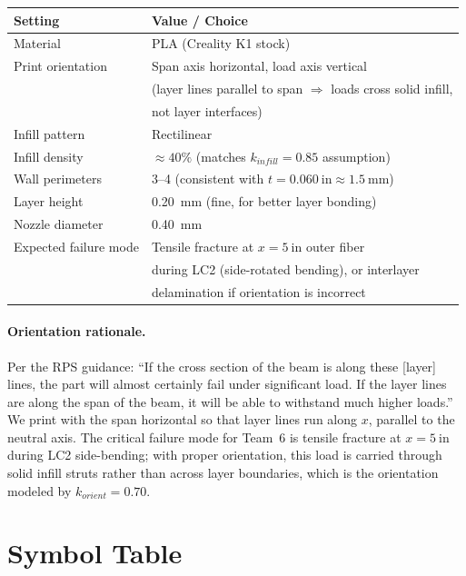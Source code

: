 \documentclass[11pt,letterpaper]{article}
\begin{document}
\begin{center}
\begin{tabular}{ll}
\toprule
Setting & Value / Choice \\
\midrule
Material           & PLA (Creality K1 stock) \\
Print orientation  & Span axis horizontal, load axis vertical \\
                   & (layer lines parallel to span $\Rightarrow$ loads cross solid infill, \\
                   & not layer interfaces) \\
Infill pattern     & Rectilinear \\
Infill density     & $\approx 40\%$ (matches $k_{infill} = 0.85$ assumption) \\
Wall perimeters    & 3--4 (consistent with $t = 0.060\ \mathrm{in} \approx 1.5\ \mathrm{mm}$) \\
Layer height       & \SI{0.20}{mm} (fine, for better layer bonding) \\
Nozzle diameter    & \SI{0.40}{mm} \\
Expected failure mode & Tensile fracture at $x = 5\ \mathrm{in}$ outer fiber \\
                   & during LC2 (side-rotated bending), or interlayer \\
                   & delamination if orientation is incorrect \\
\bottomrule
\end{tabular}
\end{center}

\paragraph{Orientation rationale.}
Per the RPS guidance: ``If the cross section of the beam is along these
[layer] lines, the part will almost certainly fail under significant load.
If the layer lines are along the span of the beam, it will be able to
withstand much higher loads.''  We print with the span horizontal so that
layer lines run along $x$, parallel to the neutral axis.  The critical
failure mode for Team~6 is tensile fracture at $x = 5\ \mathrm{in}$ during
LC2 side-bending; with proper orientation, this load is carried through
solid infill struts rather than across layer boundaries, which is the
orientation modeled by $k_{orient} = 0.70$.


\section{Symbol Table}
\label{sec:symbols}
\end{document}
